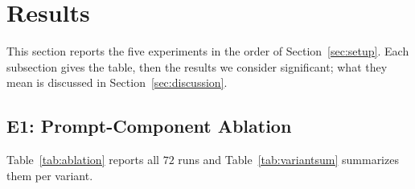 \section{Results}
\label{sec:results}
This section reports the five experiments in the order of Section~\ref{sec:setup}. Each subsection
gives the table, then the results we consider significant; what they mean is discussed in
Section~\ref{sec:discussion}.

\subsection{E1: Prompt-Component Ablation}
\label{sec:prompts}
Table~\ref{tab:ablation} reports all $72$ runs and Table~\ref{tab:variantsum} summarizes them per
variant.

